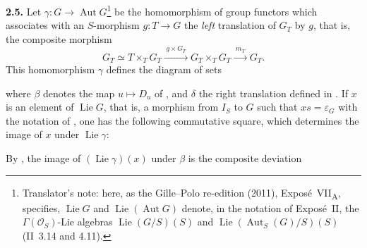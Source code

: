 \medskip
\noindent\textbf{2.5.}
\label{sga3:VIIA:2.5}
Let \(\gamma:G\to\operatorname{Aut}G\)\footnote{Translator's note:
here, as the Gille--Polo re-edition (2011), Expos\'e~VII\textsubscript{A},
specifies, \(\operatorname{Lie}G\) and \(\operatorname{Lie}(\operatorname{Aut}G)\)
denote, in the notation of Expos\'e~II, the
\(\Gamma(\mathcal O_S)\)-Lie algebras
\(\operatorname{Lie}(G/S)(S)\) and
\(\operatorname{Lie}(\operatorname{Aut}_S(G)/S)(S)\)
(II~3.14 and 4.11).} be the homomorphism of group
functors which associates with an \(S\)-morphism \(g:T\to G\) the
\emph{left} translation of \(G_T\) by \(g\), that is, the composite
morphism
\[
  G_T\simeq T\times_TG_T\xrightarrow{\;g\times G_T\;}G_T\times_TG_T
  \xrightarrow{\;m_T\;}G_T.
\]
This homomorphism \(\gamma\) defines the diagram of sets
\begin{center}
\end{center}
where \(\beta\) denotes the map \(u\mapsto D_u\) of , and \(\delta\)
the right translation defined in . If \(x\) is an element of
\(\operatorname{Lie}G\), that is, a morphism from \(I_S\) to \(G\) such
that \(xs=\varepsilon_G\) with the notation of , one has the
following commutative square, which determines the image of \(x\) under
\(\operatorname{Lie}\gamma\):
\begin{center}
\end{center}
By , the image of \((\operatorname{Lie}\gamma)(x)\) under \(\beta\) is
the composite deviation
\begin{center}
{\small
{}}
\end{center}
